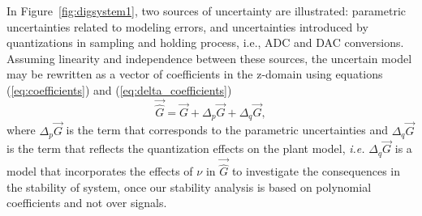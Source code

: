 \documentclass[final]{sig-alternate-05-2015}
\newcommand{\red}[1]{{\color{red}#1}}
\begin{document}
%
In Figure~\ref{fig:digsystem1}, two sources of uncertainty are illustrated:
parametric uncertainties related to modeling errors, and uncertainties
introduced by quantizations in sampling and holding process, i.e., ADC and
DAC conversions.  Assuming linearity and independence between these sources,
the uncertain model may be rewritten as a vector of coefficients in the
z-domain using equations (\ref{eq:coefficients}) and
(\ref{eq:delta_coefficients})
%
\begin{equation}
\label{eq:complete_unc_model}
\vec{\hat{G}}=\vec{G}+\Delta_p \vec{G}+\Delta_q \vec{G},
\end{equation}
%
where $\Delta_p \vec{G}$ is the term that corresponds to the parametric
uncertainties and $\Delta_q \vec{G}$ is the term that reflects the
quantization effects on the plant model, {\it i.e.} $\Delta_q \vec{G}$ is 
a model that incorporates the effects of $\nu$ in $\vec{\hat{G}}$ to 
investigate the consequences in the stability of system, once our stability 
analysis is based on polynomial coefficients and not over signals.

\end{document}
